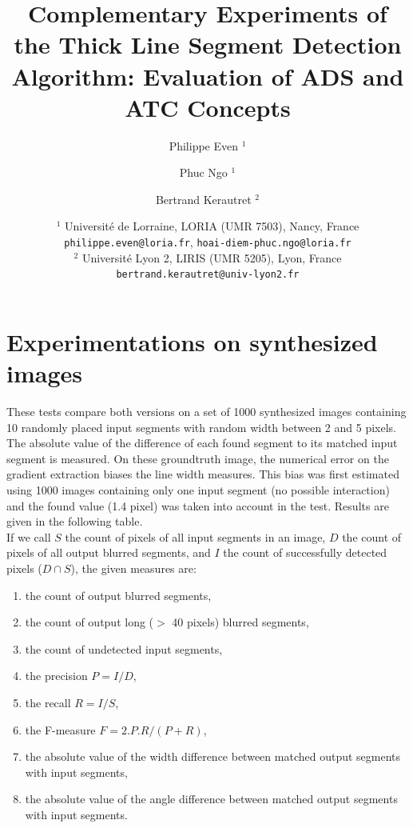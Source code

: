\documentclass[11pt]{article}
\title{Complementary Experiments of the Thick Line Segment Detection Algorithm: Evaluation of ADS and ATC Concepts}
\date{
  $^1$ Universit\'e de Lorraine, LORIA (UMR 7503), Nancy, France \\
  \texttt{philippe.even@loria.fr},
  \texttt{hoai-diem-phuc.ngo@loria.fr}\\
  $^2$  Universit\'e Lyon 2, LIRIS (UMR 5205), Lyon, France\\
  \texttt{bertrand.kerautret@univ-lyon2.fr}}
\author{Philippe Even $^1$ \and Phuc Ngo $^1$ \and Bertrand Kerautret $^2$}
\begin{document}
\maketitle







\section{Experimentations on synthesized images}
These tests compare both versions on a set of 1000 synthesized images containing
10 randomly placed input segments with random width between 2 and 5 pixels.
The absolute value of the difference of each found segment to its matched input segment is measured.
On these groundtruth image, the numerical error on the gradient extraction biases the line width measures.
This bias was first estimated using 1000 images containing only one input segment (no possible interaction) and the found value (1.4 pixel) was taken into account in the test.
Results are given in the following table. \\

If we call $S$ the count of pixels of all input segments in an image,
$D$ the count of pixels of all output blurred segments,
and $I$ the count of successfully detected pixels ($D \cap S$),
the given measures are:
\begin{enumerate}
\item the count of output blurred segments,
\item the count of output long ($>$ 40 pixels) blurred segments,
\item the count of undetected input segments,
\item the precision $P = I/D$,
\item the recall $R = I/S$,
\item the F-measure $F = 2.P.R / (P+R)$,
\item the absolute value of the width difference between matched output segments with input segments,
\item the absolute value of the angle difference between matched output segments with input segments.
\end{enumerate}
\end{document}

